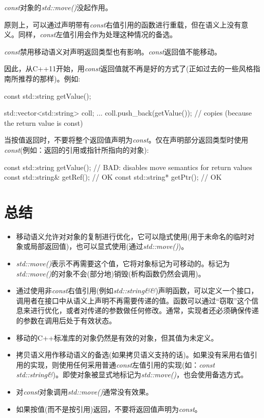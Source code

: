 \textit{const}对象的\textit{std::move()}没起作用。\par

原则上，可以通过声明带有\textit{const}右值引用的函数进行重载，但在语义上没有意义。同样，\textit{const}左值引用会作为处理这种情况的备选。\par


\textit{const}禁用移动语义对声明返回类型也有影响。\textit{const}返回值不能移动。\par

因此，从C++11开始，用\textit{const}返回值就不再是好的方式了(正如过去的一些风格指南所推荐的那样)。例如:\par

\begin{codebox}[cpp]
const std::string getValue();

std::vector<std::string> coll;
...
coll.push_back(getValue()); // copies (because the return value is const)
\end{codebox}

当按值返回时，不要将整个返回值声明为\textit{const}。仅在声明部分返回类型时使用\textit{const}(例如：返回的引用或指针所指向的对象):\par

\begin{codebox}[cpp]
const std::string getValue(); // BAD: disables move semantics for return values
const std::string& getRef(); // OK
const std::string* getPtr(); // OK
\end{codebox}


\section{总结}

\begin{itemize}
  \item 移动语义允许对对象的复制进行优化，它可以隐式使用(用于未命名的临时对象或局部返回值)，也可以显式使用(通过\textit{std::move()})。
  \item \textit{std::move()}表示不再需要这个值，它将对象标记为可移动的。标记为\textit{std::move()}的对象不会(部分地)销毁(析构函数仍然会调用)。
  \item 通过使用非\textit{const}右值引用(例如\textit{std::\allowbreak{}string\&\&})声明函数，可以定义一个接口，调用者在接口中从语义上声明不再需要传递的值。函数可以通过“窃取”这个信息来进行优化，或者对传递的参数做任何修改。通常，实现者还必须确保传递的参数在调用后处于有效状态。
  \item 移动的C++标准库的对象仍然是有效的对象，但其值为未定义。
  \item 拷贝语义用作移动语义的备选(如果拷贝语义支持的话)。如果没有采用右值引用的实现，则使用任何采用普通\textit{const}左值引用的实现(如：\textit{const std::\allowbreak{}string\&})。即使对象被显式地标记为\textit{std::move()}，也会使用备选方式。
  \item 对\textit{const}对象调用\textit{std::move()}通常没有效果。
  \item 如果按值(而不是按引用)返回，不要将返回值声明为\textit{const}。
\end{itemize}
